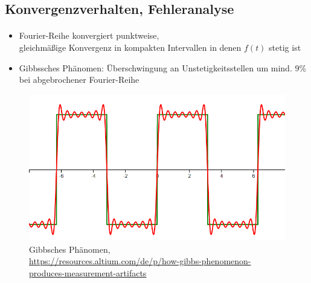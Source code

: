 \subsection{Konvergenzverhalten, Fehleranalyse}
\begin{frame}{\insertsection}
	\framesubtitle{\insertsubsection}
	\begin{itemize}
		\vspace{1em}
		\item Fourier-Reihe konvergiert punktweise,
		\\ gleichmäßige Konvergenz in kompakten Intervallen in denen $f(t)$ stetig ist
		\item Gibbssches Phänomen: Überschwingung an Unstetigkeitsstellen um mind. $9\%$ bei abgebrochener Fourier-Reihe
	\end{itemize}
	\begin{figure}
		\centering
		\includegraphics[scale=0.15]{images/gibbs.png}
		\caption*{\centering Gibbsches Phänomen, \\ \href{https://resources.altium.com/de/p/how-gibbs-phenomenon-produces-measurement-artifacts}{https://resources.altium.com/de/p/how-gibbs-phenomenon-produces-measurement-artifacts}}
	\end{figure}
\end{frame}

